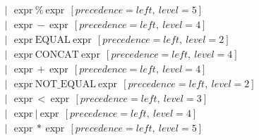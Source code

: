 \documentclass[a4paper,12pt]{book} %
\begin{document}
\begin{align*}
                                      & |\ \ \ \text{expr}\ \%\ \text{expr}\ \ [precedence=left,\ level=5]                                                                                                                                                        \\
                                      & |\ \ \ \text{expr}\ -\ \text{expr}\ \ [precedence=left,\ level=4]                                                                                                                                                         \\
                                      & |\ \ \ \text{expr}\ \text{EQUAL}\ \text{expr}\ \ [precedence=left,\ level=2]                                                                                                                                              \\
                                      & |\ \ \ \text{expr}\ \text{CONCAT}\ \text{expr}\ \ [precedence=left,\ level=4]                                                                                                                                             \\
                                      & |\ \ \ \text{expr}\ +\ \text{expr}\ \ [precedence=left,\ level=4]                                                                                                                                                         \\
                                      & |\ \ \ \text{expr}\ \text{NOT\_EQUAL}\ \text{expr}\ \ [precedence=left,\ level=2]                                                                                                                                         \\
                                      & |\ \ \ \text{expr}\ <\ \text{expr}\ \ [precedence=left,\ level=3]                                                                                                                                                         \\
                                      & |\ \ \ \text{expr}\ |\ \text{expr}\ \ [precedence=left,\ level=4]                                                                                                                                                         \\
                                      & |\ \ \ \text{expr}\ *\ \text{expr}\ \ [precedence=left,\ level=5]                                                                                                                                                         \\

\end{align*}
\end{document}
